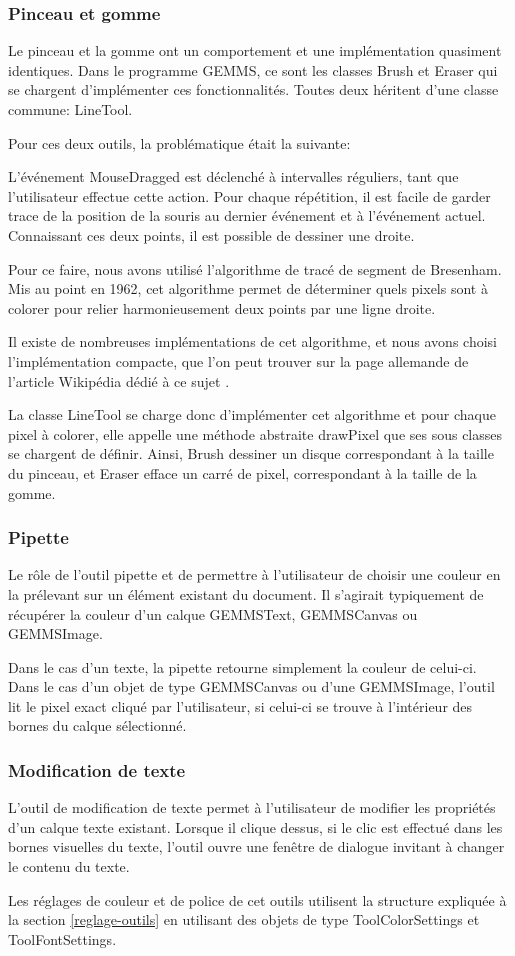 \subsubsection{Pinceau et gomme}
Le pinceau et la gomme ont un comportement et une implémentation quasiment identiques. Dans le programme GEMMS, ce sont les classes Brush et Eraser qui se chargent d'implémenter ces fonctionnalités. Toutes deux héritent d'une classe commune: LineTool. 
\par
Pour ces deux outils, la problématique était la suivante: 
\par 
L'événement MouseDragged est déclenché à intervalles réguliers, tant que l'utilisateur effectue cette action. Pour chaque répétition, il est facile de garder trace de la position de la souris au dernier événement et à l'événement actuel. Connaissant ces deux points, il est possible de dessiner une droite.
\par
Pour ce faire, nous avons utilisé l'algorithme de tracé de segment de Bresenham. Mis au point en 1962, cet algorithme permet de déterminer quels pixels sont à colorer pour relier harmonieusement deux points par une ligne droite.
\par
Il existe de nombreuses implémentations de cet algorithme, et nous avons choisi l'implémentation compacte, que l'on peut trouver sur la page allemande de l'article Wikipédia dédié à ce sujet \cite{Bresenham}.
\par
La classe LineTool se charge donc d'implémenter cet algorithme et pour chaque pixel à colorer, elle appelle une méthode abstraite drawPixel que ses sous classes se chargent de définir. Ainsi, Brush dessiner un disque correspondant à la taille du pinceau, et Eraser efface un carré de pixel, correspondant à la taille de la gomme.
\subsubsection{Pipette}
Le rôle de l'outil pipette et de permettre à l'utilisateur de choisir une couleur en la prélevant sur un élément existant du document. Il s'agirait typiquement de récupérer la couleur d'un calque GEMMSText, GEMMSCanvas ou GEMMSImage.
\par 
Dans le cas d'un texte, la pipette retourne simplement la couleur de celui-ci. Dans le cas d'un objet de type GEMMSCanvas ou d'une GEMMSImage, l'outil lit le pixel exact cliqué par l'utilisateur, si celui-ci se trouve à l'intérieur des bornes du calque sélectionné.
\subsubsection{Modification de texte}
L'outil de modification de texte permet à l'utilisateur de modifier les propriétés d'un calque texte existant. Lorsque il clique dessus, si le clic est effectué dans les bornes visuelles du texte, l'outil ouvre une fenêtre de dialogue invitant à changer le contenu du texte. 
\par
Les réglages de couleur et de police de cet outils utilisent la structure expliquée à la section \ref{reglage-outils} en utilisant des objets de type ToolColorSettings et ToolFontSettings.
